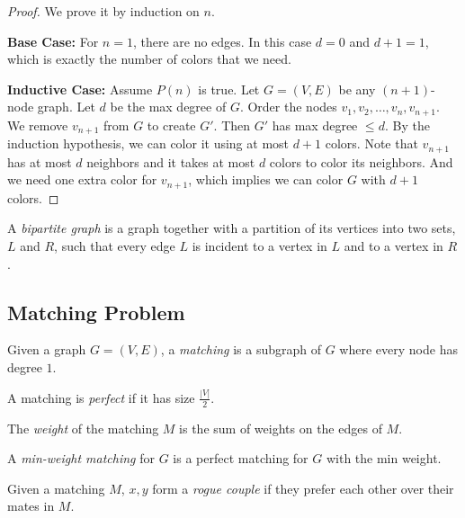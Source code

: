 \documentclass[11pt]{article}
\begin{document}
\begin{proof}
We prove it by induction on $n$.

\textbf{Base Case:} For $n=1$, there are no edges. In this case $d = 0$ and $d+1=1$, which is
exactly the number of colors that we need.

\textbf{Inductive Case:} Assume $P(n)$ is true. Let $G=(V,E)$ be any $(n+1)$-node graph. Let $d$ be
the max degree of $G$. Order the nodes $v_1,v_2,\dots,v_n,v_{n+1}$. We remove $v_{n+1}$ from $G$ to
create $G'$. Then $G'$ has max degree $\leq d$. By the induction hypothesis, we can color it using
at most $d+1$ colors. Note that $v_{n+1}$ has at most $d$ neighbors and it takes at most $d$ colors
to color its neighbors. And we need one extra color for $v_{n+1}$, which implies we can color $G$
with $d+1$ colors.
\end{proof}

\begin{definition}
A \emph{bipartite graph} is a graph together with a partition of its vertices into two sets, $L$ and
$R$, such that every edge $L$ is incident to a vertex in $L$ and to a vertex in $R$.
\end{definition}

\subsection{Matching Problem}

\begin{definition}
Given a graph $G = (V, E)$, a \emph{matching} is a subgraph of $G$ where every node has degree $1$.
\end{definition}

\begin{definition}
A matching is \emph{perfect} if it has size $\frac{|V|}{2}$.
\end{definition}

\begin{definition}
The \emph{weight} of the matching $M$ is the sum of weights on the edges of $M$.
\end{definition}

\begin{definition}
A \emph{min-weight matching} for $G$ is a perfect matching for $G$ with the min weight.
\end{definition}

\begin{definition}
Given a matching $M$, $x,y$ form a \emph{rogue couple} if they prefer each other over their mates in
$M$.
\end{definition}
\end{document}
